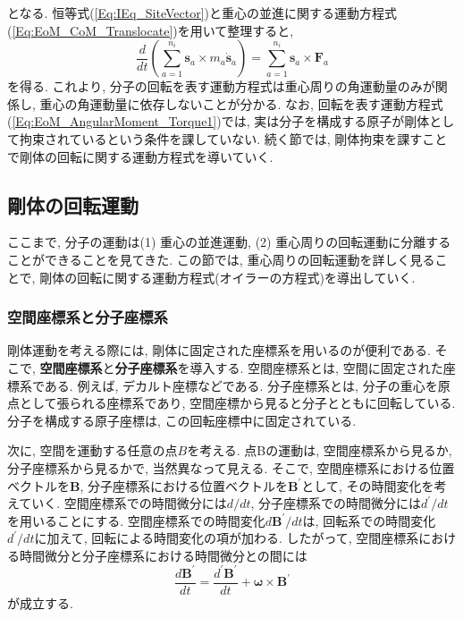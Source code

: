 となる.
恒等式(\ref{Eq:IEq_SiteVector})と重心の並進に関する運動方程式(\ref{Eq:EoM_CoM_Translocate})を用いて整理すると,
\begin{equation}
  \frac{d}{dt}
  \left(
    \sum_{a=1}^{n_{i}}
    \bm{s}_{a} \times m_{a} \dot{\bm{s}}_{a}
  \right)
  =
  \sum_{a=1}^{n_{i}}
  \bm{s}_{a} \times \bm{F}_{a}
  \label{Eq:EoM_AngularMoment_Torque2}
\end{equation}
を得る. これより, 分子の回転を表す運動方程式は重心周りの角運動量のみが関係し, 重心の角運動量に依存しないことが分かる. 
なお, 回転を表す運動方程式(\ref{Eq:EoM_AngularMoment_Torque1})では, 実は分子を構成する原子が剛体として拘束されているという条件を課していない.
続く節では, 剛体拘束を課すことで剛体の回転に関する運動方程式を導いていく.

\subsection{剛体の回転運動}

ここまで, 分子の運動は(1) 重心の並進運動, (2) 重心周りの回転運動に分離することができることを見てきた. この節では, 重心周りの回転運動を詳しく見ることで, 剛体の回転に関する運動方程式(オイラーの方程式)を導出していく.

\subsubsection{空間座標系と分子座標系}
剛体運動を考える際には, 剛体に固定された座標系を用いるのが便利である. 
そこで, \textbf{空間座標系}と\textbf{分子座標系}を導入する. 
空間座標系とは, 空間に固定された座標系である. 例えば, デカルト座標などである.
分子座標系とは, 分子の重心を原点として張られる座標系であり, 空間座標から見ると分子とともに回転している. 分子を構成する原子座標は, この回転座標中に固定されている.

次に, 空間を運動する任意の点$B$を考える.
点Bの運動は, 空間座標系から見るか, 分子座標系から見るかで, 当然異なって見える.
そこで, 空間座標系における位置ベクトルを$\bm{B}$, 分子座標系における位置ベクトルを$\bm{B}^{\prime}$として, その時間変化を考えていく.
空間座標系での時間微分には$d/dt$, 分子座標系での時間微分には$d^{\prime}/dt$を用いることにする.
空間座標系での時間変化$d\bm{B}^{\prime}/dt$は, 回転系での時間変化$d^{\prime}/dt$に加えて, 回転による時間変化の項が加わる.
したがって, 空間座標系における時間微分と分子座標系における時間微分との間には
\begin{equation}
  \frac{d\bm{B}^{\prime}}{dt}
  =
  \frac{d^{\prime}\bm{B}^{\prime}}{dt}
  +
  \bm{\omega} \times \bm{B}^{\prime}
  \label{Eq:time_dev_coordinate}
\end{equation}
が成立する.


